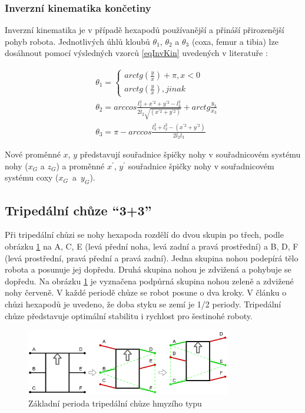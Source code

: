 \subsubsection*{Inverzní kinematika končetiny}
Inverzní kinematika je v případě hexapodů používanější a přináší přirozenější pohyb robota. Jednotlivých úhlů kloubů $\theta_1$, $\theta_2$ a $\theta_3$ (coxa, femur a tibia) lze dosáhnout pomocí výsledných vzorců \eqref{eqInvKin} uvedených v literatuře \cite{HexapodKinematics}:

\begin{equation} \label{eqInvKin}
\begin{split}
& \theta_{1}=\begin{cases} arctg\left(\frac{y}{x}\right)+\pi, x < 0 \\ arctg\left(\frac{y}{x}\right), jinak \end{cases} \\
& \theta_{2}=arccos\frac{l_{2}^{2}+x^{\prime 2}+y^{\prime 2}-l_{3}^{2}}{2l_{2}\sqrt{(x^{\prime 2}+y^{\prime 2})}}+arctg\frac{y_{3}}{x_{3}} \\
& \theta_{3}=\pi-arccos\frac{l_{3}^{2}+l_{2}^{2}-(x^{\prime 2}+y^{\prime 2})}{2l_{2}l_{3}}
\end{split}
\end{equation}

Nové proměnné $x$, $y$ představují souřadnice špičky nohy v souřadnicovém systému nohy ($x_G$ a $z_G$) a proměnné $x^{\prime}$, $y^{\prime}$ souřadnice špičky nohy v souřadnicovém systému coxy ($x_G$~a~$y_G$).


\subsection*{Tripedální chůze ``3+3''} \label{sectripodgait}
Při tripedální chůzi se nohy hexapoda rozdělí do dvou skupin po třech, podle obrázku \ref{tripodgait} na A, C, E (levá přední noha, levá zadní a pravá prostřední) a B, D, F (levá prostřední, pravá přední a pravá zadní). Jedna skupina nohou podepírá tělo robota a posunuje jej dopředu. Druhá skupina nohou je zdvižená a pohybuje se dopředu. Na obrázku \ref{tripodgait} je vyznačena podpůrná skupina nohou zeleně a zdvižené nohy červeně. V každé periodě chůze se robot posune o dva kroky. V článku o chůzi hexapodů \cite{HexapodSymetric} je uvedeno, že doba styku se zemí je 1/2 periody. Tripedální chůze představuje optimální stabilitu i rychlost pro šestinohé roboty.

\begin{figure}[hbt]
	\centering
	\includegraphics[width=0.8\textwidth]{obrazky-figures/tripodgait.png}
	\caption{Základní perioda tripedální chůze hmyzího typu}
	\label{tripodgait}
\end{figure}


